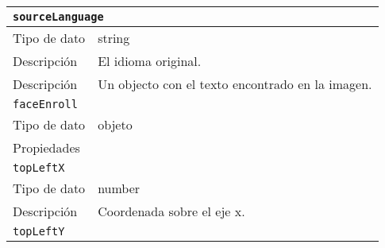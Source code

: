 \begin{longtable}{|l|l|}
\multicolumn{2}{|l|}{\texttt{sourceLanguage}}                                                                                                                                                  \\ \hline
Tipo de dato                                  & string                                                                                                                                         \\ \hline
Descripción                                   & El idioma original.                                                                                                                            \\ \hline
Descripción                                   & Un objecto con el texto encontrado en la imagen.                                                                                               \\ \hline
\multicolumn{2}{|l|}{\cellcolor[HTML]{68CBD0}\texttt{faceEnroll}}                                                                                                                              \\ \hline
Tipo de dato                                  & objeto                                                                                                                                         \\ \hline
\multicolumn{2}{|l|}{Propiedades}                                                                                                                                                              \\ \hline
\multicolumn{2}{|l|}{\texttt{topLeftX}}                                                                                                                                                        \\ \hline
Tipo de dato                                  & number                                                                                                                                         \\ \hline
Descripción                                   & Coordenada sobre el eje x.                                                                                                                     \\ \hline
\multicolumn{2}{|l|}{\texttt{topLeftY}}                                                                                                                                                        \\ \hline

\end{longtable}
